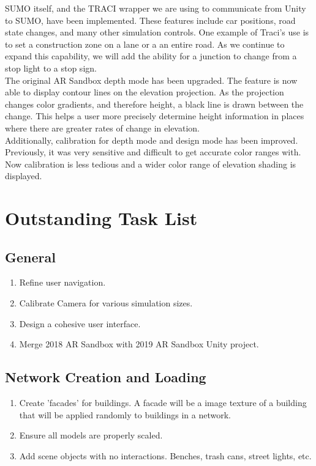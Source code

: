 \documentclass[letterpaper, 10pt, onecolumn, draftclsnofoot]{IEEEtran}
\begin{document}
        SUMO itself, and the TRACI wrapper we are using to communicate from Unity to SUMO, have been implemented. These features include car positions, road state changes, and many other simulation controls. One example of Traci's use is to set a construction zone on a lane or a an entire road. As we continue to expand this capability, we will add the ability for a junction to change from a stop light to a stop sign.\\
        
        The original AR Sandbox depth mode has been upgraded. The feature is now able to display contour lines on the elevation projection. As the projection changes color gradients, and therefore height, a black line is drawn between the change. This helps a user more precisely determine height information in places where there are greater rates of change in elevation. \\
        
        Additionally, calibration for depth mode and design mode has been improved. Previously, it was very sensitive and difficult to get accurate color ranges with. Now calibration is less tedious and a wider color range of elevation shading is displayed.

\section{Outstanding Task List}
    \subsection{General}
        \begin{enumerate}
            \item Refine user navigation.
            \item Calibrate Camera for various simulation sizes.
            \item Design a cohesive user interface.
            \item Merge 2018 AR Sandbox with 2019 AR Sandbox Unity project.
        \end{enumerate}

    \subsection{Network Creation and Loading}
        \begin{enumerate}
            \item Create 'facades' for buildings. A facade will be a image texture of a building that will be applied randomly to buildings in a network.  
            \item Ensure all models are properly scaled.
            \item Add scene objects with no interactions. Benches, trash cans, street lights, etc.
        \end{enumerate}
        
\end{document}
